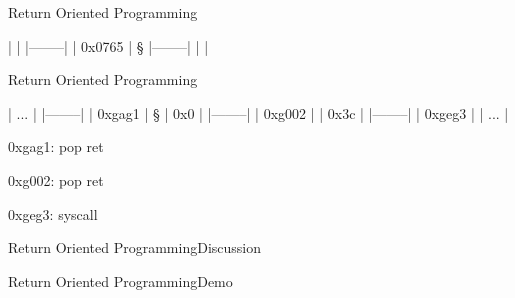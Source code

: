 \begin{slide}{Return Oriented Programming}{}
  \begin{nicscolumn*}{1cm}{2cm}{6cm}
    \tiny{}
    \begin{nicscode}
      |        |
      |--------|
      | 0x0765 | §
      |--------|
      |        |
    \end{nicscode}
  \end{nicscolumn*}
\end{slide}

\begin{slide}{Return Oriented Programming}{}
  \begin{nicscolumn*}{1cm}{2cm}{6cm}
    \tiny{}
    \begin{nicscode}
      |  ...   |
      |--------|
      | 0xgag1 |  §
      |    0x0 |
      |--------|
      | 0xg002 |
      |   0x3c |
      |--------|
      | 0xgeg3 |
      |  ...   |
    \end{nicscode}
  \end{nicscolumn*}
  \begin{nicscolumn*}{8cm}{2cm}{6cm}
    \tiny{}
    \begin{nicscode}
      0xgag1: pop %
              ret
    \end{nicscode}
    \nicssmallskip
    \begin{nicscode}
      0xg002: pop %
              ret
    \end{nicscode}
    \nicssmallskip
    \begin{nicscode}
      0xgeg3: syscall
    \end{nicscode}
  \end{nicscolumn*}
\end{slide}

\begin{slide}{Return Oriented Programming}{Discussion}
  \begin{nicscolumn}
    \begin{nicsindent}
    \end{nicsindent}
  \end{nicscolumn}
\end{slide}

\begin{slide}{Return Oriented Programming}{Demo}
  \begin{nicscolumn}
  \end{nicscolumn}
\end{slide}

